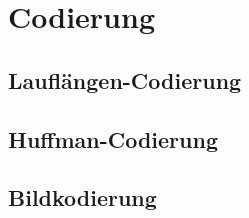 \section{Codierung}
\subsection{Lauflängen-Codierung}
\subsection{Huffman-Codierung}
\subsection{Bildkodierung}